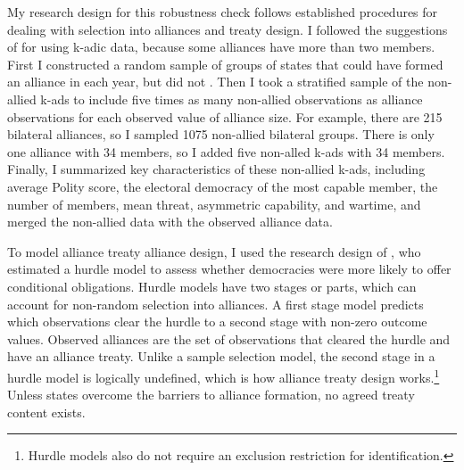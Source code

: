 \documentclass[12pt]{article}
\begin{document}
My research design for this robustness check follows established procedures for dealing with selection into alliances and treaty design. 
I followed the suggestions of \citet{Poast2010} for using k-adic data, because some alliances have more than two members. 
First I constructed a random sample of groups of states that could have formed an alliance in each year, but did not \citep{FordhamPoast2014}.
Then I took a stratified sample of the non-allied k-ads to include five times as many non-allied observations as alliance observations for each observed value of alliance size. 
For example, there are 215 bilateral alliances, so I sampled 1075 non-allied bilateral groups. 
There is only one alliance with 34 members, so I added five non-alled k-ads with 34 members. 
Finally, I summarized key characteristics of these non-allied k-ads, including average Polity score, the electoral democracy of the most capable member, the number of members, mean threat, asymmetric capability, and wartime, and merged the non-allied data with the observed alliance data. 


To model alliance treaty alliance design, I used the research design of \citet{Chibaetal2015}, who estimated a hurdle model to assess whether democracies were more likely to offer conditional obligations.
Hurdle models have two stages or parts, which can account for non-random selection into alliances.
A first stage model predicts which observations clear the hurdle to a second stage with non-zero outcome values. 
Observed alliances are the set of observations that cleared the hurdle and have an alliance treaty. 
Unlike a sample selection model, the second stage in a hurdle model is logically undefined, which is how alliance treaty design works.\footnote{Hurdle models also do not require an exclusion restriction for identification.} 
Unless states overcome the barriers to alliance formation, no agreed treaty content exists. 
\end{document}

